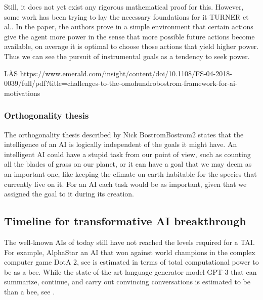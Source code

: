 \documentclass[12pt,A4]{report}
\newcommand{\autobaj}{}
\theoremstyle{definition}
\begin{document}

Still, it does not yet exist any rigorous mathematical proof for this. However, some work has been trying to lay the necessary foundations for it \autobaj{TURNER et al.}. In the paper, the authors prove in a simple environment that certain actions give the agent more power in the sense that more possible future actions become available, on average it is optimal to choose those actions that yield higher power. Thus we can see the pursuit of instrumental goals as a tendency to seek power.

LÄS
https://www.emerald.com/insight/content/doi/10.1108/FS-04-2018-0039/full/pdf?title=challenges-to-the-omohundrobostrom-framework-for-ai-motivations

\subsubsection{Orthogonality thesis}
The orthogonality thesis described by Nick Bostrom\autobaj{Bostrom2} states that the intelligence of an AI is logically independent of the goals it might have. An intelligent AI could have a stupid task from our point of view, such as counting all the blades of grass on our planet, or it can have a goal that we may deem as an important one, like keeping the climate on earth habitable for the species that currently live on it. For an AI each task would be as important, given that we assigned the goal to it during its creation.



\subsection{Timeline for transformative AI breakthrough}
The well-known AIs of today still have not reached the levels required for a TAI. For example, AlphaStar an AI that won against world champions in the complex computer game DotA 2, see \citet{ALphaStar} is estimated in terms of total computational power to be  as a bee. While the state-of-the-art language generator model GPT-3 that can summarize, continue, and carry out convincing conversations is estimated to be  than a bee, see \citet{Ajeya}.
\end{document}
